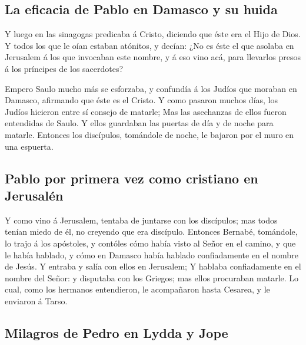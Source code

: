 \hypertarget{la-eficacia-de-pablo-en-damasco-y-su-huida}{%
\subsection{La eficacia de Pablo en Damasco y su
huida}\label{la-eficacia-de-pablo-en-damasco-y-su-huida}}

 Y luego en las sinagogas predicaba á Cristo, diciendo que
éste era el Hijo de Dios.  Y todos los que le oían estaban
atónitos, y decían: ¿No es éste el que asolaba en Jerusalem á los que
invocaban este nombre, y á eso vino acá, para llevarlos presos á los
príncipes de los sacerdotes?

 Empero Saulo mucho más se esforzaba, y confundía á los
Judíos que moraban en Damasco, afirmando que éste es el Cristo.
 Y como pasaron muchos días, los Judíos hicieron entre sí
consejo de matarle;  Mas las asechanzas de ellos fueron
entendidas de Saulo. Y ellos guardaban las puertas de día y de noche
para matarle.  Entonces los discípulos, tomándole de noche,
le bajaron por el muro en una espuerta.

\hypertarget{pablo-por-primera-vez-como-cristiano-en-jerusaluxe9n}{%
\subsection{Pablo por primera vez como cristiano en
Jerusalén}\label{pablo-por-primera-vez-como-cristiano-en-jerusaluxe9n}}

 Y como vino á Jerusalem, tentaba de juntarse con los
discípulos; mas todos tenían miedo de él, no creyendo que era discípulo.
 Entonces Bernabé, tomándole, lo trajo á los apóstoles, y
contóles cómo había visto al Señor en el camino, y que le había hablado,
y cómo en Damasco había hablado confiadamente en el nombre de Jesús.
 Y entraba y salía con ellos en Jerusalem;  Y
hablaba confiadamente en el nombre del Señor: y disputaba con los
Griegos; mas ellos procuraban matarle.  Lo cual, como los
hermanos entendieron, le acompañaron hasta Cesarea, y le enviaron á
Tarso.

\hypertarget{milagros-de-pedro-en-lydda-y-jope}{%
\subsection{Milagros de Pedro en Lydda y
Jope}\label{milagros-de-pedro-en-lydda-y-jope}}

